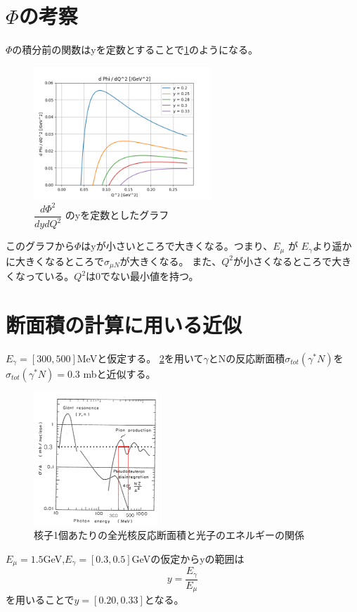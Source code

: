 \section{\texorpdfstring{$\Phi$}{LG}の考察}
$\Phi$の積分前の関数はyを定数とすることで\ref{fig:sigma3}のようになる。
\begin{figure}[H]
    \centering
    \includegraphics[height=5cm]{img/flux_fixed_y.png}
    \caption{$\dfrac{d\Phi ^2}{dydQ^2}$ のyを定数としたグラフ}
    \label{fig:sigma3}
\end{figure}
このグラフから$\Phi$はyが小さいところで大きくなる。つまり、$E_\mu$ が $E_\gamma$より遥かに大きくなるところで$\sigma_{\mu N}$が大きくなる。
また、$Q^2$が小さくなるところで大きくなっている。$Q^2$は0でない最小値を持つ。

\section{断面積の計算に用いる近似}
$E_\gamma = [300, 500]$MeVと仮定する。
\ref{fig:sigma4}を用いて$\gamma$とNの反応断面積$\sigma_{tot}(\gamma^* N)$を
$\sigma_{tot}(\gamma^* N) = 0.3$ mbと近似する。
\begin{figure}[H]
    \centering
    \includegraphics[height=5cm]{img/sigma_tot.png}
    \caption{核子1個あたりの全光核反応断面積と光子のエネルギーの関係}
    \label{fig:sigma4}
\end{figure}
$E_\mu = 1.5$GeV,$E_\gamma = [0.3, 0.5]$GeVの仮定からyの範囲は
\begin{equation}
    y = \dfrac{E_\gamma}{E_\mu}
\end{equation}
を用いることで$y = [0.20, 0.33]$となる。


